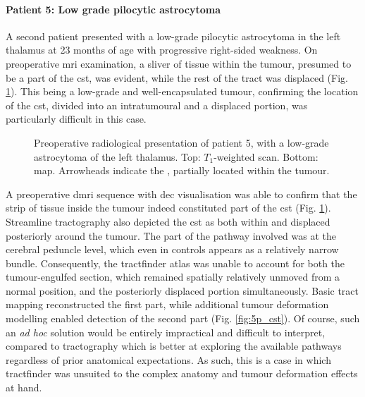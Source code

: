 \documentclass[12pt,phd,a4paper,twoside]{ucl_thesis}
\begin{document}
\paragraph*{Patient 5: Low grade pilocytic astrocytoma}

A second patient presented with a low-grade pilocytic astrocytoma in the left thalamus at 23 months of age with progressive right-sided weakness.
On preoperative \gls{mri} examination, a sliver of tissue within the tumour, presumed to be a part of the \gls{cst}, was evident, while the rest of the tract was displaced (Fig. \ref{fig:5p}).
This being a low-grade and well-encapsulated tumour, confirming the location of the \gls{cst}, divided into an intratumoural and a displaced portion, was particularly difficult in this case.

\begin{figure}[htb!]
  \centering
  
  
  \caption[GOSH iMRI patient 5, preoperative imaging]{Preoperative radiological presentation of  patient 5, with a low-grade astrocytoma of the left thalamus. Top: $T_1$-weighted scan. Bottom:    map. Arrowheads indicate the , partially located within the tumour.}
  \label{fig:5p}
\end{figure}

A preoperative \gls{dmri} sequence with \gls{dec} visualisation was able to confirm that the strip of tissue inside the tumour indeed constituted part of the \gls{cst} (Fig. \ref{fig:5p}).
Streamline tractography also depicted the \gls{cst} as both within and displaced posteriorly around the tumour.
The part of the pathway involved was at the cerebral peduncle level, which even in controls appears as a relatively narrow bundle.
Consequently, the tractfinder atlas was unable to account for both the tumour-engulfed section, which remained spatially relatively unmoved from a normal position, and the posteriorly displaced portion simultaneously.
Basic tract mapping reconstructed the first part, while additional tumour deformation modelling enabled detection of the second part (Fig. \ref{fig:5p_cst}).
Of course, such an \textit{ad hoc} solution would be entirely impractical and difficult to interpret, compared to tractography which is better at exploring the available pathways regardless of prior anatomical expectations.
As such, this is a case in which tractfinder was unsuited to the complex anatomy and tumour deformation effects at hand.
\end{document}
